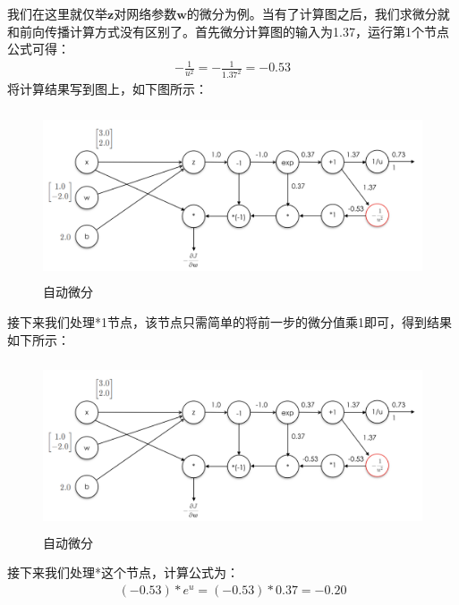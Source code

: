 \documentclass[UTF8]{article}
\begin{document}
我们在这里就仅举$\boldsymbol{z}$对网络参数$\boldsymbol{w}$的微分为例。当有了计算图之后，我们求微分就和前向传播计算方式没有区别了。首先微分计算图的输入为1.37，运行第1个节点公式可得：
\begin{equation}
\begin{aligned}
-\frac{1}{u^2}=-\frac{1}{1.37^2}=-0.53
\end{aligned}
\label{mlp-sigmoid-cg-17}
\end{equation}
将计算结果写到图上，如下图所示：
\begin{figure}[H]
	\caption{自动微分}
	\label{f000055}
	\centering
	\includegraphics[height=5cm]{images/f000055}
\end{figure}
接下来我们处理*1节点，该节点只需简单的将前一步的微分值乘1即可，得到结果如下所示：
\begin{figure}[H]
	\caption{自动微分}
	\label{f000056}
	\centering
	\includegraphics[height=5cm]{images/f000056}
\end{figure}
接下来我们处理*这个节点，计算公式为：
\begin{equation}
\begin{aligned}
(-0.53)*e^u=(-0.53)*0.37=-0.20
\end{aligned}
\label{mlp-sigmoid-cg-18}
\end{equation}
\end{document}
